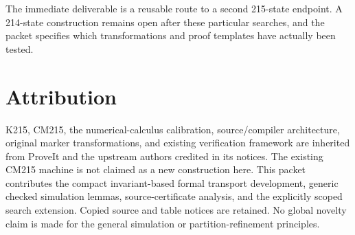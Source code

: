 \documentclass[11pt,letterpaper]{article}
\theoremstyle{definition}
\begin{document}
The immediate deliverable is a reusable route to a second 215-state
endpoint. A 214-state construction remains open after these particular
searches, and the packet specifies which transformations and proof
templates have actually been tested.

\section*{Attribution}

K215, CM215, the numerical-calculus calibration, source/compiler
architecture, original marker transformations, and existing verification
framework are inherited from ProveIt and the upstream authors credited
in its notices. The existing CM215 machine is not claimed as a new
construction here. This packet contributes the compact invariant-based
formal transport development, generic checked simulation lemmas,
source-certificate analysis, and the explicitly scoped search extension.
Copied source and table notices are retained. No global novelty claim is
made for the general simulation or partition-refinement principles.
\end{document}
